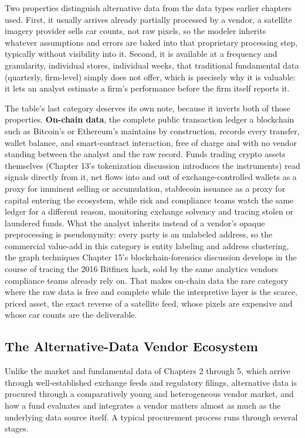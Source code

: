 \documentclass[../ai_in_finance]{subfiles}
\begin{document}
Two properties distinguish alternative data from the data types earlier chapters used. First, it usually arrives already partially processed by a vendor, a satellite imagery provider sells car counts, not raw pixels, so the modeler inherits whatever assumptions and errors are baked into that proprietary processing step, typically without visibility into it. Second, it is available at a frequency and granularity, individual stores, individual weeks, that traditional fundamental data (quarterly, firm-level) simply does not offer, which is precisely why it is valuable: it lets an analyst estimate a firm's performance before the firm itself reports it.

The table's last category deserves its own note, because it inverts both of those properties. \textbf{On-chain data}, the complete public transaction ledger a blockchain such as Bitcoin's or Ethereum's maintains by construction, records every transfer, wallet balance, and smart-contract interaction, free of charge and with no vendor standing between the analyst and the raw record. Funds trading crypto assets themselves (Chapter 13's tokenization discussion introduces the instruments) read signals directly from it, net flows into and out of exchange-controlled wallets as a proxy for imminent selling or accumulation, stablecoin issuance as a proxy for capital entering the ecosystem, while risk and compliance teams watch the same ledger for a different reason, monitoring exchange solvency and tracing stolen or laundered funds. What the analyst inherits instead of a vendor's opaque preprocessing is pseudonymity: every party is an unlabeled address, so the commercial value-add in this category is entity labeling and address clustering, the graph techniques Chapter 15's blockchain-forensics discussion develops in the course of tracing the 2016 Bitfinex hack, sold by the same analytics vendors compliance teams already rely on. That makes on-chain data the rare category where the raw data is free and complete while the interpretive layer is the scarce, priced asset, the exact reverse of a satellite feed, whose pixels are expensive and whose car counts are the deliverable.

\subsection{The Alternative-Data Vendor Ecosystem}
\label{sec:vendor-ecosystem}

Unlike the market and fundamental data of Chapters 2 through 5, which arrive through well-established exchange feeds and regulatory filings, alternative data is procured through a comparatively young and heterogeneous vendor market, and how a fund evaluates and integrates a vendor matters almost as much as the underlying data source itself. A typical procurement process runs through several stages.
\end{document}
